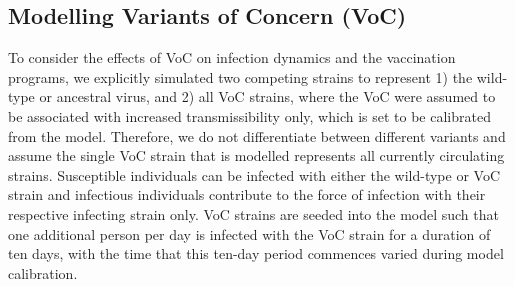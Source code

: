 \subsection{Modelling Variants of Concern (VoC)}
To consider the effects of VoC on infection dynamics and the vaccination programs, we explicitly simulated two competing strains to represent 1) the wild-type or ancestral virus, and 2) all VoC strains, where the VoC were assumed to be associated with increased transmissibility only, which is set to be calibrated from the model. Therefore, we do not differentiate between different variants and assume the single VoC strain that is modelled represents all currently circulating strains. Susceptible individuals can be infected with either the wild-type or VoC strain and infectious individuals contribute to the force of infection with their respective infecting strain only. VoC strains are seeded into the model such that one additional person per day is infected with the VoC strain for a duration of ten days, with the time that this ten-day period commences varied during model calibration.